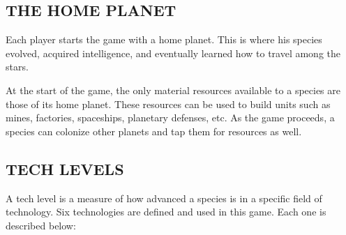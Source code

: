 \documentclass[10pt,titlepage]{article}
\begin{document}
\subsection{THE HOME PLANET}

Each player starts the game with a home planet.  This is where his species
evolved, acquired intelligence, and eventually learned how to travel among the
stars.

At the start of the game, the only material resources available to a species
are those of its home planet.  These resources can be used to build units
such as mines, factories, spaceships, planetary defenses, etc.  As the game
proceeds, a species can colonize other planets and tap them for resources
as well.


\subsection{TECH LEVELS}

A tech level is a measure of how advanced a species is in a specific field of
technology.  Six technologies are defined and used in this game.  Each one is
described below:
\end{document}
